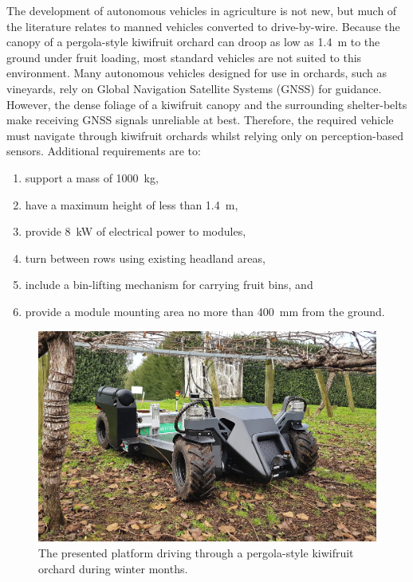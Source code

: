 \documentclass[preprint,authoryear,12pt]{elsarticle}
\begin{document}
    The development of autonomous vehicles in agriculture is not new, but much of the literature relates to manned vehicles converted to drive-by-wire.
    Because the canopy of a pergola-style kiwifruit orchard can droop as low as \SI{1.4}{\meter} to the ground under fruit loading, most standard vehicles are not suited to this environment.
    Many autonomous vehicles designed for use in orchards, such as vineyards, rely on Global Navigation Satellite Systems (GNSS) for guidance.
    However, the dense foliage of a kiwifruit canopy and the surrounding shelter-belts make receiving GNSS signals unreliable at best.
    Therefore, the required vehicle must navigate through kiwifruit orchards whilst relying only on perception-based sensors.
    Additional requirements are to:
    \begin{enumerate}
        \item support a mass of \SI{1000}{\kilo\gram},
        \item have a maximum height of less than \SI{1.4}{\meter},
        \item provide \SI{8}{\kilo\watt} of electrical power to modules,
        \item turn between rows using existing headland areas,
        \item include a bin-lifting mechanism for carrying fruit bins, and
        \item provide a module mounting area no more than \SI{400}{\milli\meter} from the ground.
    \end{enumerate}
    \begin{figure}[htb]
        \centering
        \includegraphics[width=\linewidth]{images/suzy_general.jpg}
        \caption{
            The presented platform driving through a pergola-style kiwifruit orchard during winter months.
        }
        \label{fig:suzy}
    \end{figure}
\end{document}
